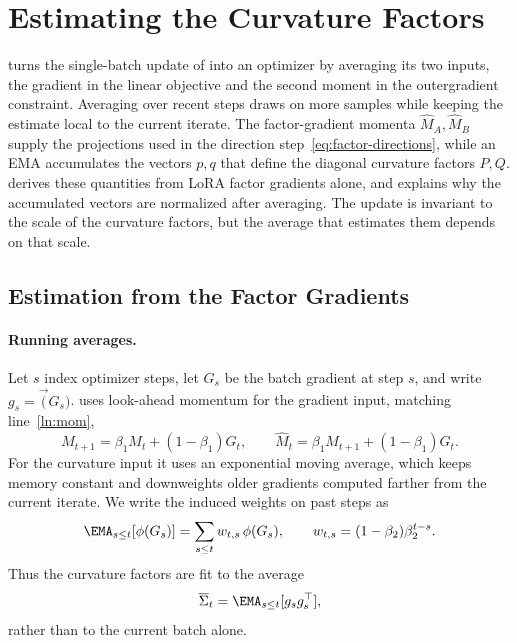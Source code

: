 
\section{Estimating the Curvature Factors}
\label{app:matnormal-t4}
 turns the single-batch update of
 into an optimizer by averaging its two inputs,
the gradient in the linear objective and the second moment in the
outergradient constraint. Averaging over recent steps draws on more samples
while keeping the estimate local to the current iterate. The factor-gradient
momenta $\widehat M_A,\widehat M_B$ supply
the projections used in the direction step~\eqref{eq:factor-directions},
while an EMA accumulates the vectors $p,q$ that define the diagonal
curvature factors $P,Q$.  derives these
quantities from LoRA factor gradients alone, and
 explains why the accumulated vectors are
normalized after averaging. The update is invariant to the scale of the
curvature factors, but the average that estimates them depends on that scale.

\subsection{Estimation from the Factor Gradients}
\label{sec:weighted-estimation-t4}

\paragraph{Running averages.} Let $s$ index optimizer steps, let $G_s$ be
the batch gradient at step $s$, and write $g_s=\vec(G_s)$.
 uses look-ahead momentum for the gradient input, matching
line~\ref{ln:mom},
\[
  M_{t+1}=\beta_1M_t+(1-\beta_1)G_t,
  \qquad
  \widehat M_t=\beta_1M_{t+1}+(1-\beta_1)G_t.
\]
For the curvature input it uses an exponential moving average, which keeps
memory constant and downweights older gradients computed farther from the
current iterate. We write the induced weights on past steps as
\[
  \EMA_{s \leq t}[\phi(G_s)]=\sum_{s\le t}w_{t,s}\,\phi(G_s),
  \qquad
  w_{t,s}=(1-\beta_2)\beta_2^{t-s}.
\]
Thus the curvature factors are fit to the average
\[
  \overline{\Sigma}_t=\EMA_{s\leq t}[g_sg_s^\top],
\]
rather than to the current batch alone.


